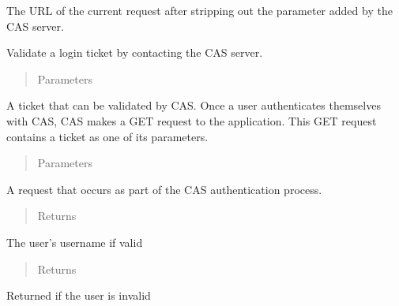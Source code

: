 \documentclass[letterpaper,10pt,english]{sphinxmanual}
\begin{document}
\begin{fulllineitems}
\begin{fulllineitems}
\begin{quote}
\begin{description}
\end{description}\end{quote}

The URL of the current request after stripping out the  
parameter added by the CAS server.

\end{fulllineitems}


\begin{fulllineitems}
\label{\detokenize{tiger_leagues/readme:tiger_leagues.cas_client.CASClient.validate}}
Validate a login ticket by contacting the CAS server.
\begin{quote}\begin{description}
\item[{Parameters}] \leavevmode
{} \textendash{} 

\end{description}\end{quote}

A ticket that can be validated by CAS. Once a user authenticates 
themselves with CAS, CAS makes a GET request to the application. This 
GET request contains a ticket as one of its parameters.
\begin{quote}\begin{description}
\item[{Parameters}] \leavevmode
{} \textendash{} 

\end{description}\end{quote}

A request that occurs as part of the CAS authentication process.
\begin{quote}\begin{description}
\item[{Returns}] \leavevmode
{}

\end{description}\end{quote}

The user’s username if valid
\begin{quote}\begin{description}
\item[{Returns}] \leavevmode
{}

\end{description}\end{quote}

Returned if the user is invalid

\end{fulllineitems}


\end{fulllineitems}
\end{document}
